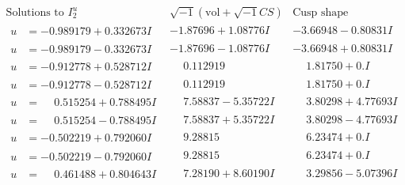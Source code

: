 \documentclass[1p]{elsarticle_modified}
\theoremstyle{definition}
\newcommand{\I}{\sqrt{-1}}
\begin{document}
$$\begin{array}{c|c|c}  
\text{Solutions to }I^u_{2}& \I (\text{vol} + \sqrt{-1}CS) & \text{Cusp shape}\\
 \hline 
\begin{aligned}
u &= -0.989179 + 0.332673 I\end{aligned}
 & -1.87696 + 1.08776 I & -3.66948 - 0.80831 I \\ \hline\begin{aligned}
u &= -0.989179 - 0.332673 I\end{aligned}
 & -1.87696 - 1.08776 I & -3.66948 + 0.80831 I \\ \hline\begin{aligned}
u &= -0.912778 + 0.528712 I\end{aligned}
 & \phantom{-}0.112919\phantom{ +0.000000I} & \phantom{-}1.81750 + 0. I\phantom{ +0.000000I} \\ \hline\begin{aligned}
u &= -0.912778 - 0.528712 I\end{aligned}
 & \phantom{-}0.112919\phantom{ +0.000000I} & \phantom{-}1.81750 + 0. I\phantom{ +0.000000I} \\ \hline\begin{aligned}
u &= \phantom{-}0.515254 + 0.788495 I\end{aligned}
 & \phantom{-}7.58837 - 5.35722 I & \phantom{-}3.80298 + 4.77693 I \\ \hline\begin{aligned}
u &= \phantom{-}0.515254 - 0.788495 I\end{aligned}
 & \phantom{-}7.58837 + 5.35722 I & \phantom{-}3.80298 - 4.77693 I \\ \hline\begin{aligned}
u &= -0.502219 + 0.792060 I\end{aligned}
 & \phantom{-}9.28815\phantom{ +0.000000I} & \phantom{-}6.23474 + 0. I\phantom{ +0.000000I} \\ \hline\begin{aligned}
u &= -0.502219 - 0.792060 I\end{aligned}
 & \phantom{-}9.28815\phantom{ +0.000000I} & \phantom{-}6.23474 + 0. I\phantom{ +0.000000I} \\ \hline\begin{aligned}
u &= \phantom{-}0.461488 + 0.804643 I\end{aligned}
 & \phantom{-}7.28190 + 8.60190 I & \phantom{-}3.29856 - 5.07396 I \\ \hline\begin{aligned}

\end{aligned}
\end{array}$$
\end{document}

